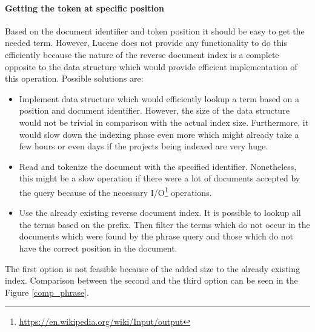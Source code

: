 \paragraph{Getting the token at specific position}
Based on the document identifier and token position it should be easy to get the needed term. However, Lucene does not
provide any functionality to do this efficiently because the nature of the reverse document index is a complete
opposite to the data structure which would provide efficient implementation of this operation. Possible solutions are:
\begin{itemize}
    \item Implement data structure which would efficiently lookup a term based on a position and document identifier.
    However, the size of the data structure would not be trivial in comparison with the actual index size. Furthermore,
    it would slow down the indexing phase even more which might already take a few hours or even days if the projects
    being indexed are very huge.
    \item Read and tokenize the document with the specified identifier. Nonetheless, this might be a slow operation if there
    were a lot of documents accepted by the query because of the necessary
    I/O\footnote{\url{https://en.wikipedia.org/wiki/Input/output}} operations.
    \item Use the already existing reverse document index. It is possible to lookup all the terms based on the prefix.
    Then filter the terms which do not occur in the documents which were found by the phrase query and those which
    do not have the correct position in the document.
\end{itemize}

The first option is not feasible because of the added size to the already existing index. Comparison between the
second and the third option can be seen in the Figure \ref{comp_phrase}.


